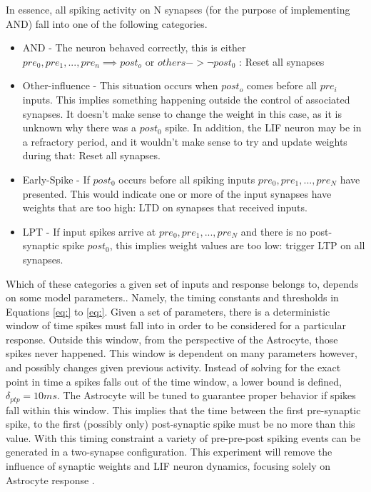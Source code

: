 


In essence, all spiking activity on N synapses (for the purpose of implementing
AND) fall into one of the following categories.
\begin{itemize}
\item AND - The neuron behaved correctly, this is either $pre_0, pre_1, ...,
  pre_n \implies post_o$ or $others -> \neg post_0$ : Reset all synapses
\item Other-influence - This situation occurs when $post_o$ comes before all
  $pre_i$ inputs. This implies something happening outside the control of
  associated synapses. It doesn't make sense to change the weight in this case,
  as it is unknown why there was a $post_0$ spike. In addition, the LIF neuron
  may be in a refractory period, and it wouldn't make sense to try and update
  weights during that: Reset all synapses.
\item Early-Spike - If $post_0$ occurs before all spiking inputs $pre_0, pre_1,
  ..., pre_N$ have presented. This would indicate one or more of the input
  synapses have weights that are too high: LTD on synapses that received inputs.
\item LPT - If input spikes arrive at $pre_0, pre_1, ..., pre_N$ and there is no
  post-synaptic spike $post_0$, this implies weight values are too low: trigger
  LTP on all synapses.
\end{itemize}

Which of these categories a given set of inputs and response belongs to, depends
on some model parameters.. Namely, the timing constants and thresholds in
Equations \ref{eq:} to \ref{eq:}. Given a set of parameters, there is a
deterministic window of time spikes must fall into in order to be considered for
a particular response. Outside this window, from the perspective of the
Astrocyte, those spikes never happened. This window is dependent on many
parameters however, and possibly changes given previous activity. Instead of
solving for the exact point in time a spikes falls out of the time window, a
lower bound is defined, $\delta_{ptp}=10ms$. The Astrocyte will be tuned to
guarantee proper behavior if spikes fall within this window. This implies that
the time between the first pre-synaptic spike, to the first (possibly only)
post-synaptic spike must be no more than this value. With this timing constraint
a variety of pre-pre-post spiking events can be generated in a two-synapse
configuration. This experiment will remove the influence of synaptic weights and
LIF neuron dynamics, focusing solely on Astrocyte response \ca.

